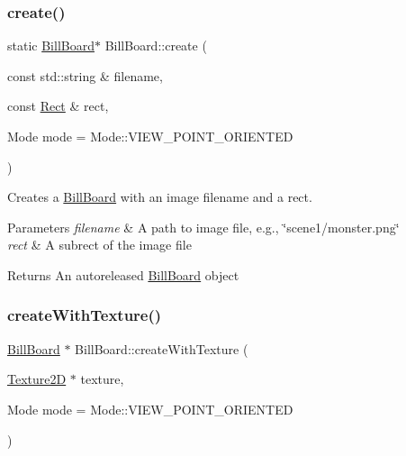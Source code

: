 \subsubsection{\texorpdfstring{create()}{create()}\hspace{0.1cm}{\footnotesize\ttfamily [6/6]}}
{\footnotesize\ttfamily static \hyperlink{classBillBoard}{Bill\+Board}$\ast$ Bill\+Board\+::create (\begin{DoxyParamCaption}\item[{const std\+::string \&}]{filename,  }\item[{const \hyperlink{classRect}{Rect} \&}]{rect,  }\item[{Mode}]{mode = {\ttfamily Mode\+:\+:VIEW\+\_\+POINT\+\_\+ORIENTED} }\end{DoxyParamCaption})\hspace{0.3cm}{\ttfamily [static]}}

Creates a \hyperlink{classBillBoard}{Bill\+Board} with an image filename and a rect.


\begin{DoxyParams}{Parameters}
{\em filename} & A path to image file, e.\+g., \char`\"{}scene1/monster.\+png\char`\"{} \\
\hline
{\em rect} & A subrect of the image file \\
\hline
\end{DoxyParams}
\begin{DoxyReturn}{Returns}
An autoreleased \hyperlink{classBillBoard}{Bill\+Board} object 
\end{DoxyReturn}
\mbox{\label{classBillBoard_a60cefc735da0b8289c37c1424c1ed301}} 
\subsubsection{\texorpdfstring{create\+With\+Texture()}{createWithTexture()}\hspace{0.1cm}{\footnotesize\ttfamily [1/2]}}
{\footnotesize\ttfamily \hyperlink{classBillBoard}{Bill\+Board} $\ast$ Bill\+Board\+::create\+With\+Texture (\begin{DoxyParamCaption}\item[{\hyperlink{classTexture2D}{Texture2D} $\ast$}]{texture,  }\item[{Mode}]{mode = {\ttfamily Mode\+:\+:VIEW\+\_\+POINT\+\_\+ORIENTED} }\end{DoxyParamCaption})\hspace{0.3cm}{\ttfamily [static]}}


